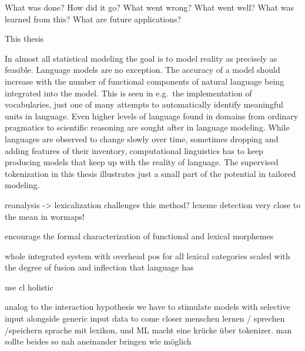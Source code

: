 What was done?
How did it go?
What went wrong?
What went well?
What was learned from this?
What are future applications?


This thesis

In almost all statistical modeling the goal is to model reality as precisely as feasible.
Language models are no exception.
The accuracy of a model should increase with the number of functional components of natural language being integrated into the model.
This is seen in e.g.\ the implementation of vocabularies, just one of many attempts to automatically identify meaningful units in language.
Even higher levels of language found in domains from ordinary pragmatics to scientific reasoning are sought after in language modeling.
While languages are observed to change slowly over time, sometimes dropping and adding features of their inventory, computational linguistics has to keep producing models that keep up with the reality of language.
The supervised tokenization in this thesis illustrates just a small part of the potential in tailored modeling.



reanalysis -> lexicalization challenges this method?
lexeme detection very close to the mean in wormaps!


encourage the formal characterization of functional and lexical morphemes


whole integrated system with overhead pos for all lexical categories
scaled with the degree of fusion and inflection that language has

use \ac{cl}
holistic

analog to the interaction hypothesis we have to stimulate models with selective input alongside generic input data to come closer
menschen lernen / sprechen /speichern sprache mit lexikon, und ML macht eine krücke über tokenizer. man sollte beides so nah aneinander bringen wie möglich